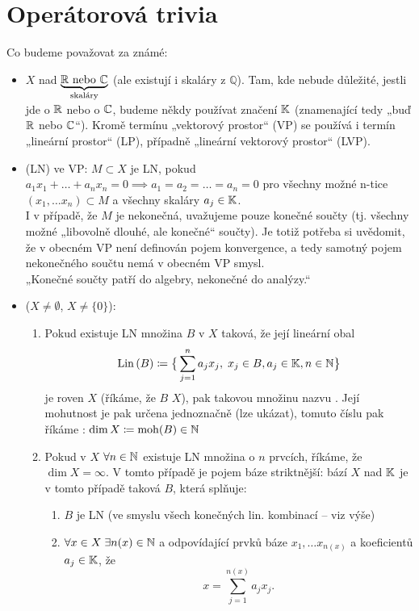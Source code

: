 \section{Operátorová trivia}

Co budeme považovat za známé:
\begin{itemize}
    \item {} $X$ nad $\underbrace{\mathbb{R}\text{ nebo }\mathbb{C}}_{\text{skaláry}}$ (ale existují i skaláry z $\mathbb{Q}$). Tam, kde nebude důležité, jestli jde o $\mathbb{R}$ nebo o $\mathbb{C}$, budeme někdy používat značení $\mathbb{K}$ (znamenající tedy „buď $\mathbb{R}$ nebo $\mathbb{C}$“). Kromě termínu „vektorový prostor“ (VP) se používá i termín „lineární prostor“ (LP), případně „lineární vektorový prostor“ (LVP).
    
    \item {} (LN)  ve VP: $M \subset X$ je LN, pokud $a_1 x_1 + \dots + a_n x_n = 0 \implies a_1 = a_2 = \dots = a_n = 0$ pro všechny možné n-tice $(x_1, \dots x_n) \subset M$ a všechny skaláry $a_j \in \mathbb{K}$.
    \\[5pt]
    \Poznamka I v případě, že $M$ je nekonečná, uvažujeme pouze konečné součty (tj. všechny možné „libovolně dlouhé, ale konečné“ součty). Je totiž potřeba si uvědomit, že v obecném VP není definován pojem konvergence, a tedy samotný pojem nekonečného součtu nemá v obecném VP smysl.
    \\[5pt]
    „Konečné součty patří do algebry, nekonečné do analýzy.“
    
    \item {} ($X \neq \emptyset$, $X \neq \{0\}$):
    \begin{enumerate}
        \item Pokud existuje  LN množina $B$ v $X$ taková, že její lineární obal
        $$ \operatorname{Lin}\,(B) \coloneqq \big\{ \sum_{j=1}^n a_j x_j, \;  x_j \in B, a_j \in \mathbb{K}, n \in \mathbb{N} \big\} $$
        je roven $X$ (říkáme, že $B$  $X$), pak takovou množinu nazvu . Její mohutnost je pak určena jednoznačně (lze ukázat), tomuto číslu pak říkáme : $\dim X \coloneqq \operatorname{moh}(B) \in \mathbb{N}$
        \item Pokud v $X$ $\forall n \in \mathbb{N}$ existuje LN množina o $n$ prvcích, říkáme, že $\dim X = \infty$. V tomto případě je pojem báze striktnější: bází $X$ nad $\mathbb{K}$ je v tomto případě taková  $B$, která splňuje:
        \begin{enumerate}
            \item $B$ je LN (ve smyslu všech konečných lin. kombinací – viz výše)
            \item $\forall x \in X \; \exists n(x) \in \mathbb{N}$ a odpovídající  prvků báze $x_1, \dots x_{n(x)}$ a koeficientů $a_j \in \mathbb{K}$, že
            $$ x = \sum_{j=1}^{n(x)} a_j x_j. $$
        \end{enumerate}
        

\end{enumerate}
\end{itemize}
